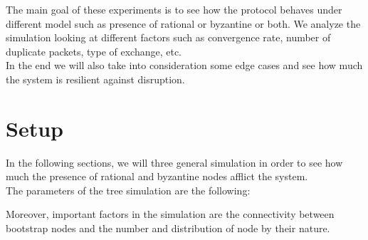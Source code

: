 \documentclass[mscthesis]{usiinfthesis}
\begin{document}
The main goal of these experiments is to see how the protocol behaves under different model such as presence of rational or byzantine or both. We analyze the simulation looking at different factors such as convergence rate, number of duplicate packets, type of exchange, etc. \\
In the end we will also take into consideration some edge cases and see how much the system is resilient against disruption.

\section{Setup}
In the following sections, we will three general simulation in order to see how much the presence of rational and byzantine nodes afflict the system. \\
The parameters of the tree simulation are the following:

\begin{table}[H]
\centering
{}
\caption{Simulation parameters}
\label{tab:simulation-parameters-two}
\end{table}

Moreover, important factors in the simulation are the connectivity between bootstrap nodes and the number and distribution of node by their nature.
\end{document}

